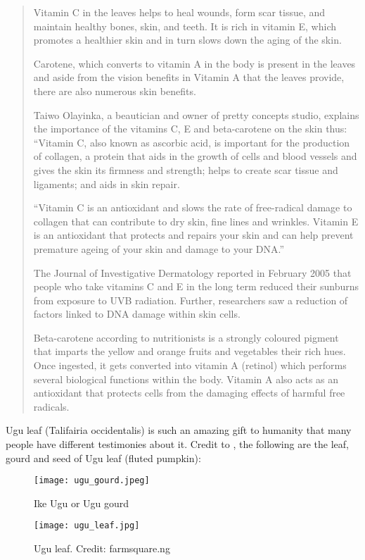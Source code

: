 \begin{quotation}
	Vitamin C in the leaves helps to heal wounds, form scar tissue, and maintain healthy bones, skin, and teeth. It is rich in vitamin E, which promotes a healthier skin and in turn slows down the aging of the skin.
	
	Carotene, which converts to vitamin A in the body is present in the leaves and aside from the vision benefits in Vitamin A that the leaves provide, there are also numerous skin benefits.
	
	
	Taiwo Olayinka, a beautician and owner of pretty concepts studio, explains the importance of the vitamins C, E and beta-carotene on the skin thus: “Vitamin C, also known as ascorbic acid, is important for the production of collagen, a protein that aids in the growth of cells and blood vessels and gives the skin its firmness and strength; helps to create scar tissue and ligaments; and aids in skin repair.
	
	“Vitamin C is an antioxidant and slows the rate of free-radical damage to collagen that can contribute to dry skin, fine lines and wrinkles. Vitamin E is an antioxidant that protects and repairs your skin and can help prevent premature ageing of your skin and damage to your DNA.”
	
	The Journal of Investigative Dermatology reported in February 2005 that people who take vitamins C and E in the long term reduced their sunburns from exposure to UVB radiation. Further, researchers saw a reduction of factors linked to DNA damage within skin cells.
	
	Beta-carotene according to nutritionists is a strongly coloured pigment that imparts the yellow and orange fruits and vegetables their rich hues. Once ingested, it gets converted into vitamin A (retinol) which performs several biological functions within the body. Vitamin A also acts as an antioxidant that protects cells from the damaging effects of harmful free radicals.
\end{quotation}

Ugu leaf (Talifairia occidentalis) is such an amazing gift to humanity that many people have different testimonies about it. Credit to \citep{7AmazingUses}, the following are the leaf, gourd and seed of Ugu leaf (fluted pumpkin): 

\begin{figure}[!h]
	\centering	
	\label{fig:ugu_leaf}
	\texttt{[image: ugu\_gourd.jpeg]}
	\caption{Ike Ugu or Ugu gourd} 

\end{figure}
\newpage
\begin{figure}[!h]
	\centering
	\label{fig:ugu_leaf}
	\texttt{[image: ugu\_leaf.jpg]}
	\caption{Ugu leaf. Credit: farmsquare.ng} 
	
\end{figure}

